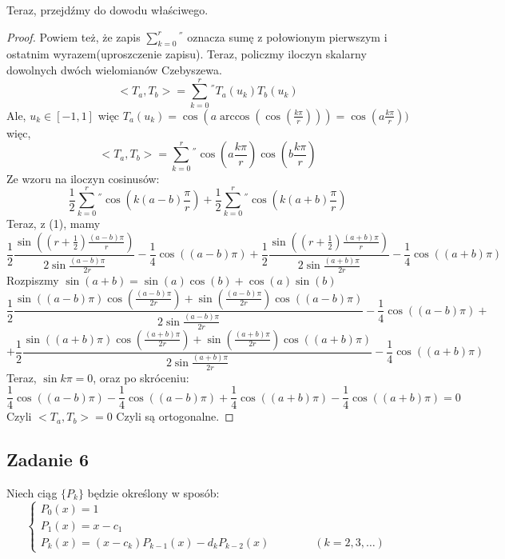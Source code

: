 \documentclass[a4paper]{article}
\begin{document}
Teraz, przejdźmy do dowodu właściwego.

\begin{proof}


Powiem też, że zapis $\sum\limits_{k=0}^{r}{}^{''}$ oznacza sumę z połowionym pierwszym i ostatnim wyrazem(uproszczenie zapisu).
Teraz, policzmy iloczyn skalarny dowolnych dwóch wielomianów Czebyszewa.
$$<T_a,T_b> = \sum\limits_{k=0}^{r}{}^{''}T_a(u_k) T_b(u_k)$$
Ale, $u_k \in [-1,1]$ więc $T_a(u_k) = \cos(a \arccos (\cos(\frac{k\pi}{r})))=\cos(a \frac{k\pi}{r}))$ więc,
$$<T_a,T_b> = \sum\limits_{k=0}^{r}{}^{''} \cos(a \frac{k\pi}{r}) \cos(b \frac{k\pi}{r})$$
Ze wzoru na iloczyn cosinusów:
$$\frac{1}{2} \sum\limits_{k=0}^{r}{}^{''} \cos(k(a-b)\frac{\pi}{r}) + \frac{1}{2} \sum\limits_{k=0}^{r}{}^{''} \cos(k(a+b)\frac{\pi}{r})$$
Teraz, z (1), mamy
$$\frac{1}{2} \frac{\sin((r+\frac{1}{2})\frac{(a-b)\pi}{r})}{2\sin{\frac{(a-b)\pi}{2r}}} - \frac{1}{4}\cos((a-b)\pi) + \frac{1}{2} \frac{\sin((r+\frac{1}{2})\frac{(a+b)\pi}{r})}{2\sin{\frac{(a+b)\pi}{2r}}} - \frac{1}{4}\cos((a+b)\pi)$$
Rozpiszmy $\sin(a+b)=\sin(a)\cos(b)+\cos(a)\sin(b)$
$$\frac{1}{2} \frac{\sin((a-b)\pi)\cos(\frac{(a-b)\pi}{2r}) + \sin(\frac{(a-b)\pi}{2r})\cos((a-b)\pi)}{2\sin{\frac{(a-b)\pi}{2r}}} - \frac{1}{4}\cos((a-b)\pi) +$$ $$+ \frac{1}{2} \frac{\sin((a+b)\pi)\cos(\frac{(a+b)\pi}{2r}) + \sin(\frac{(a+b)\pi}{2r})\cos((a+b)\pi)}{2\sin{\frac{(a+b)\pi}{2r}}} - \frac{1}{4}\cos((a+b)\pi)$$
Teraz, $\sin{k\pi}=0$, oraz po skróceniu:
$$\frac{1}{4} \cos((a-b)\pi) - \frac{1}{4}\cos((a-b)\pi) + \frac{1}{4} \cos((a+b)\pi) - \frac{1}{4}\cos((a+b)\pi)=0$$
Czyli $<T_a,T_b>=0$
Czyli są ortogonalne.
\end{proof}


\subsection*{Zadanie 6}
Niech ciąg $\lbrace P_k \rbrace$ będzie określony w sposób:\\
$$
\left\{\begin{matrix}
P_0(x)=1 \\ 
P_1(x)=x-c_1 \\
P_k(x)=(x-c_k)P_{k-1}(x) -d_kP_{k-2}(x) &&&&& (k= 2,3,\dots) 
\end{matrix}\right.
$$
\end{document}
